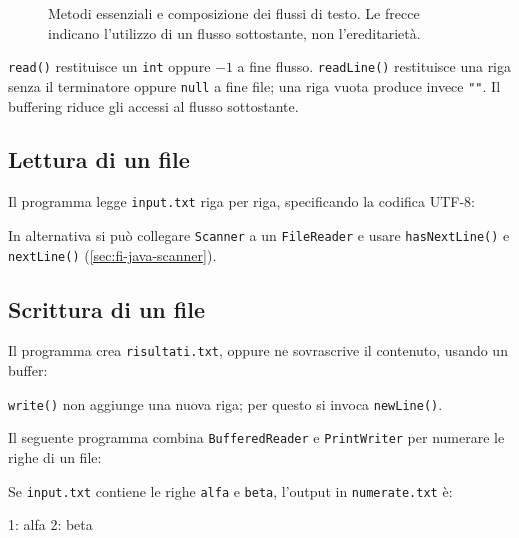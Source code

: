 \clearpage

\begin{figure}[htbp]
  \centering
  
  \caption{Metodi essenziali e composizione dei flussi di testo.
  Le frecce indicano l'utilizzo di un flusso sottostante,
  non l'ereditarietà.}
  \label{fig:fi-java-file-uml-flussi}
\end{figure}

\texttt{read()} restituisce un \texttt{int} oppure \(-1\)
a fine flusso. \texttt{readLine()} restituisce una riga senza
il terminatore oppure \texttt{null} a fine file; una riga vuota
produce invece \texttt{""}. Il buffering riduce gli accessi
al flusso sottostante.

\subsection{Lettura di un file}
\label{sec:fi-java-file-lettura}

Il programma legge \texttt{input.txt} riga per riga,
specificando la codifica UTF-8:



In alternativa si può collegare \texttt{Scanner} a un
\texttt{FileReader} e usare \texttt{hasNextLine()} e
\texttt{nextLine()} (\cref{sec:fi-java-scanner}).

\subsection{Scrittura di un file}
\label{sec:fi-java-file-scrittura}

Il programma crea \texttt{risultati.txt}, oppure ne
sovrascrive il contenuto, usando un buffer:

\clearpage



\texttt{write()} non aggiunge una nuova riga; per questo si
invoca \texttt{newLine()}.

\begin{example}
\label{ex:fi-java-file-righe-numerate}
Il seguente programma combina \texttt{BufferedReader} e
\texttt{PrintWriter} per numerare le righe di un file:



Se \texttt{input.txt} contiene le righe \texttt{alfa} e
\texttt{beta}, l'output in \texttt{numerate.txt} è:
\begin{unipdterminal}
1: alfa
2: beta
\end{unipdterminal}
\end{example}

